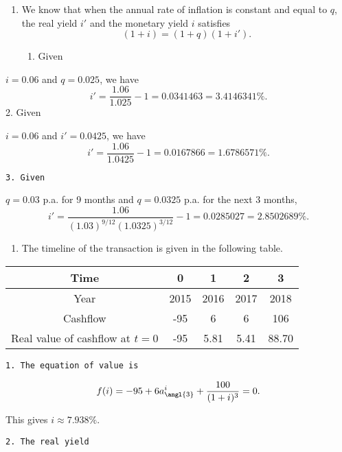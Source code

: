 \documentclass[
]{article}
\providecommand{\tightlist}{%
  \setlength{\itemsep}{0pt}\setlength{\parskip}{0pt}}
\theoremstyle{definition}
\theoremstyle{definition}
\theoremstyle{definition}
\theoremstyle{definition}
\theoremstyle{remark}
\begin{document}
\begin{enumerate}
\def\labelenumi{\arabic{enumi}.}
\setcounter{enumi}{1}
\item
  We know that when the annual rate of inflation is constant and equal to \(q\), the real yield \(i'\) and the monetary yield \(i\) satisfies \[(1 +i) = ( 1 + q)(1+i').\]

  \begin{enumerate}
  \def\labelenumii{\arabic{enumii}.}
  \tightlist
  \item
    Given
  \end{enumerate}
\end{enumerate}

\(i =0.06\) and \(q = 0.025\), we have
\[ i' = \frac{1.06}{1.025} - 1 = 0.0341463 = 3.4146341\%.\]
2. Given

\(i =0.06\) and \(i' = 0.0425\), we have
\[ i' = \frac{1.06}{1.0425} - 1 = 0.0167866 = 1.6786571\%.\]

\begin{verbatim}
3. Given 
\end{verbatim}

\(q = 0.03\) p.a. for 9 months and \(q = 0.0325\) p.a. for the next 3 months,
\[ i' = \frac{1.06}{(1.03)^{9/12}(1.0325)^{3/12}} - 1 = 0.0285027 = 2.8502689\%.\]

\begin{enumerate}
\def\labelenumi{\arabic{enumi}.}
\setcounter{enumi}{2}
\tightlist
\item
  The timeline of the transaction is given in the following table.
\end{enumerate}

\begin{longtable}[]{@{}ccccc@{}}
\toprule
Time & 0 & 1 & 2 & 3 \\
\midrule
\endhead
Year & 2015 & 2016 & 2017 & 2018 \\
Cashflow & -95 & 6 & 6 & 106 \\
Real value of cashflow at \(t = 0\) & -95 & 5.81 & 5.41 & 88.70 \\
\bottomrule
\end{longtable}

\begin{verbatim}
1. The equation of value is
\end{verbatim}

\[ f(i) = -95 + 6 a^i_{\angl{3}} + \frac{100}{(1+i)^3}  = 0.\]

This gives \(i \approx 7.938\%\).

\begin{verbatim}
2. The real yield 
\end{verbatim}
\end{document}
